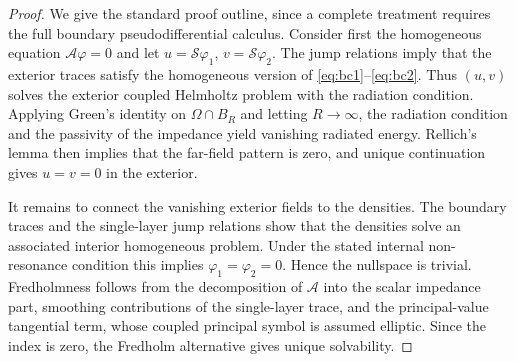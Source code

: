 \documentclass[10pt,a4paper]{amsart}
\numberwithin{equation}{section}
\begin{document}
\begin{proof}
We give the standard proof outline, since a complete treatment requires the full boundary pseudodifferential calculus. Consider first the homogeneous equation $\mathcal A\varphi=0$ and let $u=\mathcal S\varphi_1$, $v=\mathcal S\varphi_2$. The jump relations imply that the exterior traces satisfy the homogeneous version of \eqref{eq:bc1}--\eqref{eq:bc2}. Thus $(u,v)$ solves the exterior coupled Helmholtz problem with the radiation condition. Applying Green's identity on $\Omega\cap B_R$ and letting $R\to\infty$, the radiation condition and the passivity of the impedance yield vanishing radiated energy. Rellich's lemma then implies that the far-field pattern is zero, and unique continuation gives $u=v=0$ in the exterior.

It remains to connect the vanishing exterior fields to the densities. The boundary traces and the single-layer jump relations show that the densities solve an associated interior homogeneous problem. Under the stated internal non-resonance condition this implies $\varphi_1=\varphi_2=0$. Hence the nullspace is trivial. Fredholmness follows from the decomposition of $\mathcal A$ into the scalar impedance part, smoothing contributions of the single-layer trace, and the principal-value tangential term, whose coupled principal symbol is assumed elliptic. Since the index is zero, the Fredholm alternative gives unique solvability.
\end{proof}
\end{document}
